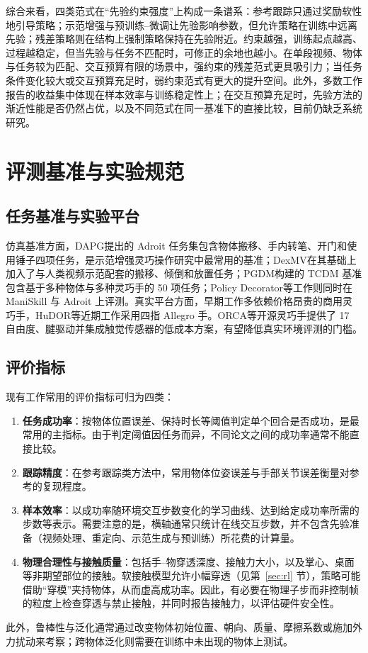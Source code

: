 \documentclass[UTF8,a4paper,zihao=-4]{ctexart}
\begin{document}
综合来看，四类范式在“先验约束强度”上构成一条谱系：参考跟踪只通过奖励软性地引导策略；示范增强与预训练–微调让先验影响参数，但允许策略在训练中远离先验；残差策略则在结构上强制策略保持在先验附近。约束越强，训练起点越高、过程越稳定，但当先验与任务不匹配时，可修正的余地也越小。在单段视频、物体与任务较为匹配、交互预算有限的场景中，强约束的残差范式更具吸引力；当任务条件变化较大或交互预算充足时，弱约束范式有更大的提升空间。此外，多数工作报告的收益集中体现在样本效率与训练稳定性上；在交互预算充足时，先验方法的渐近性能是否仍然占优，以及不同范式在同一基准下的直接比较，目前仍缺乏系统研究。

\section{评测基准与实验规范}\label{sec:eval}

\subsection{任务基准与实验平台}

仿真基准方面，DAPG\cite{dapg}提出的 Adroit 任务集包含物体搬移、手内转笔、开门和使用锤子四项任务，是示范增强灵巧操作研究中最常用的基准；DexMV\cite{dexmv}在其基础上加入了与人类视频示范配套的搬移、倾倒和放置任务；PGDM\cite{pgdm}构建的 TCDM 基准包含基于多种物体与多种灵巧手的 50 项任务；Policy Decorator\cite{policydecorator}等工作则同时在 ManiSkill 与 Adroit 上评测。真实平台方面，早期工作多依赖价格昂贵的商用灵巧手\cite{openai2018}，HuDOR\cite{hudor}等近期工作采用四指 Allegro 手。ORCA\cite{orca}等开源灵巧手提供了 17 自由度、腱驱动并集成触觉传感器的低成本方案，有望降低真实环境评测的门槛。

\subsection{评价指标}

现有工作常用的评价指标可归为四类：
\begin{enumerate}
  \item \textbf{任务成功率}：按物体位置误差、保持时长等阈值判定单个回合是否成功，是最常用的主指标。由于判定阈值因任务而异，不同论文之间的成功率通常不能直接比较。
  \item \textbf{跟踪精度}：在参考跟踪类方法中，常用物体位姿误差与手部关节误差衡量对参考的复现程度\cite{dextrack,maniptrans}。
  \item \textbf{样本效率}：以成功率随环境交互步数变化的学习曲线、达到给定成功率所需的步数等表示。需要注意的是，横轴通常只统计在线交互步数，并不包含先验准备（视频处理、重定向、示范生成与预训练）所花费的计算量。
  \item \textbf{物理合理性与接触质量}：包括手–物穿透深度、接触力大小，以及掌心、桌面等非期望部位的接触。软接触模型允许小幅穿透（见第~\ref{sec:rl} 节），策略可能借助“穿模”夹持物体，从而虚高成功率。因此，有必要在物理子步而非控制帧的粒度上检查穿透与禁止接触，并同时报告接触力，以评估硬件安全性。
\end{enumerate}
此外，鲁棒性与泛化通常通过改变物体初始位置、朝向、质量、摩擦系数或施加外力扰动来考察；跨物体泛化则需要在训练中未出现的物体上测试\cite{ilad}。
\end{document}
